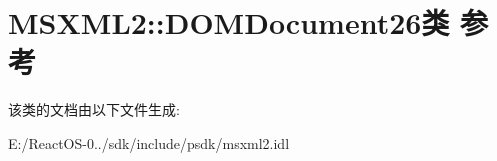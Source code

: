 \hypertarget{class_m_s_x_m_l2_1_1_d_o_m_document26}{}\section{M\+S\+X\+M\+L2\+:\+:D\+O\+M\+Document26类 参考}
\label{class_m_s_x_m_l2_1_1_d_o_m_document26}


该类的文档由以下文件生成\+:\begin{DoxyCompactItemize}
\item 
E\+:/\+React\+O\+S-\/0../sdk/include/psdk/msxml2.\+idl\end{DoxyCompactItemize}
